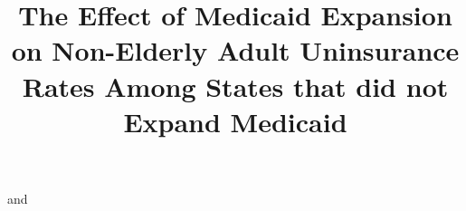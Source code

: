 \documentclass[aoas]{imsart}
\theoremstyle{plain}
\theoremstyle{remark}
\begin{document}
\begin{frontmatter}
\title{The Effect of Medicaid Expansion on Non-Elderly Adult Uninsurance Rates Among States that did not Expand Medicaid}

\begin{aug}
\author[A]{ } and
\author[A]{ }
\address[A]{Carnegie Mellon University, Heinz College and Department of Statistics and Data Science }

\end{aug}


\end{frontmatter}
\end{document}
